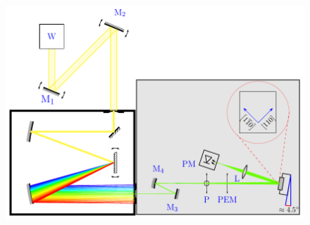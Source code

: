 \begin{figure}[ht!]
	\centering
	\includegraphics[width=\textwidth]{../figures/chapter-3/ras-setup/build/ras-setup-2.pdf}
	\caption{ }
	\label{fig:chapter-3-ras-setup}
\end{figure}



























